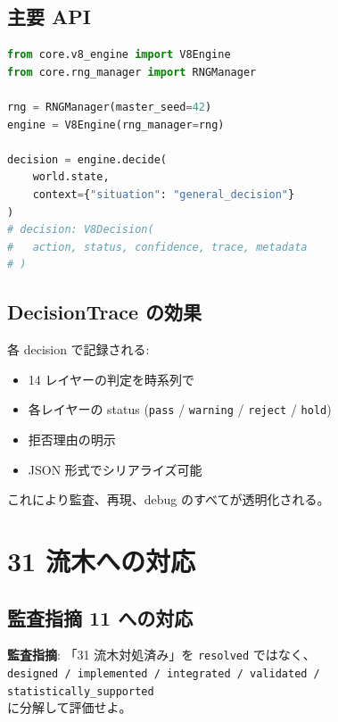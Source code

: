 \documentclass[a4paper,11pt]{report}
\begin{document}
\section{主要 API}

\begin{lstlisting}[language=Python]
from core.v8_engine import V8Engine
from core.rng_manager import RNGManager

rng = RNGManager(master_seed=42)
engine = V8Engine(rng_manager=rng)

decision = engine.decide(
    world.state, 
    context={"situation": "general_decision"}
)
# decision: V8Decision(
#   action, status, confidence, trace, metadata
# )
\end{lstlisting}

\section{DecisionTrace の効果}

各 decision で記録される:

\begin{itemize}[leftmargin=*]
  \item 14 レイヤーの判定を時系列で
  \item 各レイヤーの status (\texttt{pass} / \texttt{warning} / \texttt{reject} / \texttt{hold})
  \item 拒否理由の明示
  \item JSON 形式でシリアライズ可能
\end{itemize}

これにより監査、再現、debug のすべてが透明化される。

\chapter{31 流木への対応}

\section{監査指摘 11 への対応}

\textbf{監査指摘}: 「31 流木対処済み」を \texttt{resolved} ではなく、\\
\texttt{designed / implemented / integrated / validated / statistically\_supported}\\
に分解して評価せよ。
\end{document}
